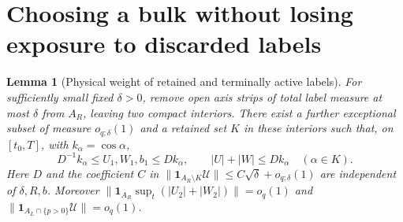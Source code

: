 \documentclass[11pt]{article}
\newtheorem{lemma}{Lemma}
\begin{document}
\section{Choosing a bulk without losing exposure to discarded labels}\label{an04e5rv1:retained}
\begin{lemma}[Physical weight of retained and terminally active labels]\label{an04e5rv1:bulklemma}
For sufficiently small fixed $\delta>0$, remove open axis strips of total label measure at most $\delta$ from $A_R$, leaving two compact interiors. There exist a further exceptional subset of measure $o_{q;\delta}(1)$ and a retained set $K$ in these interiors such that, on $[t_0,T]$, with $k_\alpha=\cos\alpha$,
\begin{equation}\label{an04e5rv1:bulk}
 D^{-1}k_\alpha\le U_1,W_1,b_1\le D k_\alpha,\qquad |U|+|W|\le Dk_\alpha
 \quad(\alpha\in K).
\end{equation}
Here $D$ and the coefficient $C$ in $\|\mathbf1_{A_R\setminus K}\mathcal U\|\le C\sqrt\delta+o_{q;\delta}(1)$ are independent of $\delta,R,b$. Moreover $\|\mathbf1_{A_R}\sup_t(|U_2|+|W_2|)\|=o_q(1)$ and $\|\mathbf1_{A_L\cap\{p>0\}}\mathcal U\|=o_q(1)$.
\end{lemma}
\end{document}
